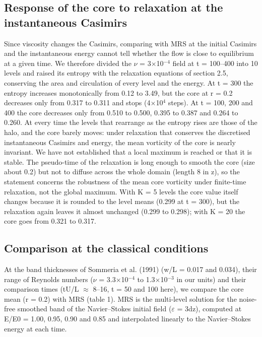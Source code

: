 \documentclass[11pt]{article}
\begin{document}
\subsection{Response of the core to relaxation at the instantaneous Casimirs}
Since viscosity changes the Casimirs, comparing with MRS at the initial Casimirs and the instantaneous energy cannot tell whether the flow is close to equilibrium at a given time. We therefore divided the $\nu{}$ = 3$\times{}$10$^{-4}$ field at t = 100--400 into 10 levels and raised its entropy with the relaxation equations of section 2.5, conserving the area and circulation of every level and the energy. At t = 300 the entropy increases monotonically from 0.12 to 3.49, but the core at r = 0.2 decreases only from 0.317 to 0.311 and stops (4$\times{}$10$^{4}$ steps). At t = 100, 200 and 400 the core decreases only from 0.510 to 0.500, 0.395 to 0.387 and 0.264 to 0.260. At every time the levels that rearrange as the entropy rises are those of the halo, and the core barely moves: under relaxation that conserves the discretised instantaneous Casimirs and energy, the mean vorticity of the core is nearly invariant. We have not established that a local maximum is reached or that it is stable. The pseudo-time of the relaxation is long enough to smooth the core (size about 0.2) but not to diffuse across the whole domain (length 8 in z), so the statement concerns the robustness of the mean core vorticity under finite-time relaxation, not the global maximum. With K = 5 levels the core value itself changes because it is rounded to the level means (0.299 at t = 300), but the relaxation again leaves it almost unchanged (0.299 to 0.298); with K = 20 the core goes from 0.321 to 0.317.

\subsection{Comparison at the classical conditions}
At the band thicknesses of Sommeria et al. (1991) (w/L = 0.017 and 0.034), their range of Reynolds numbers ($\nu{}$ = 3.3$\times{}$10$^{-4}$ to 1.3$\times{}$10$^{-3}$ in our units) and their comparison times (tU/L $\approx{}$ 8--16, t = 50 and 100 here), we compare the core mean (r = 0.2) with MRS (table 1). MRS is the multi-level solution for the noise-free smoothed band of the Navier--Stokes initial field ($\varepsilon{}$ = 3dz), computed at E/E0 = 1.00, 0.95, 0.90 and 0.85 and interpolated linearly to the Navier--Stokes energy at each time.
\end{document}
